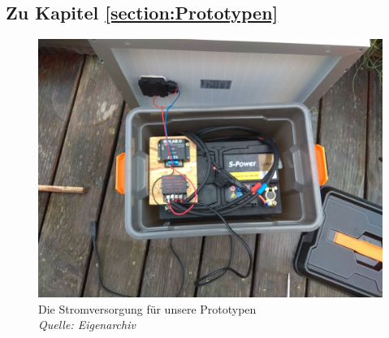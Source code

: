 \documentclass[11pt,a4paper]{article}
\begin{document}
\subsection{Zu Kapitel \autoref{section:Prototypen}}
\begin{figure}[H] \label{fig:power-supply-complete}
    \centering
    \includegraphics[width=.9\textwidth]{images/power_supply.jpg}
    \caption{Die Stromversorgung für unsere Prototypen \\
    \textit{Quelle: Eigenarchiv}}
\end{figure}
\end{document}
